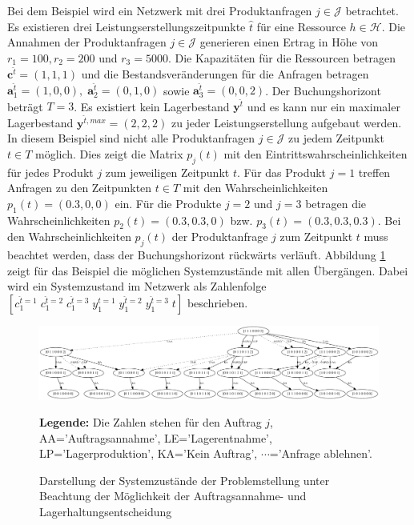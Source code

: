 Bei dem Beispiel wird ein Netzwerk mit drei Produktanfragen $j\in\mathcal{J}$ betrachtet. Es existieren drei Leistungserstellungszeitpunkte $\hat t$ für eine Ressource $h\in\mathcal{H}$. Die Annahmen der Produktanfragen $j\in\mathcal{J}$ generieren einen Ertrag in Höhe von $r_1=100, r_2=200$ und $r_3=5000$. Die Kapazitäten für die Ressourcen betragen $\textbf{c}^{\hat t}=(1,1,1)$ und die Bestandsveränderungen für die Anfragen betragen $\textbf{a}^{\hat t}_1=(1,0,0),\; \textbf{a}^{\hat t}_2=(0,1,0)$ sowie $\textbf{a}^{\hat t}_3=(0,0,2)$. Der Buchungshorizont beträgt $T=3$. Es existiert kein Lagerbestand $\textbf{y}^{\hat t}$ und es kann nur ein maximaler Lagerbestand $\textbf{y}^{\hat t, max}=(2, 2, 2)$ zu jeder Leistungserstellung aufgebaut werden. In diesem Beispiel sind nicht alle Produktanfragen $j\in\mathcal{J}$ zu jedem Zeitpunkt $t\in T$ möglich. Dies zeigt die Matrix $p_{j}(t)$ mit den Eintrittswahrscheinlichkeiten für jedes Produkt $j$ zum jeweiligen Zeitpunkt $t$. Für das Produkt $j=1$ treffen Anfragen zu den Zeitpunkten $t\in T$ mit den Wahrscheinlichkeiten $p_{1}(t)=(0.3, 0, 0)$ ein. Für die Produkte $j=2$ und $j=3$ betragen die Wahrscheinlichkeiten $p_{2}(t)=(0.3, 0.3, 0)$ bzw. $p_{3}(t)=(0.3, 0.3, 0.3)$. Bei den Wahrscheinlichkeiten $p_j(t)$ der Produktanfrage $j$ zum Zeitpunkt $t$ muss beachtet werden, dass der Buchungshorizont rückwärts verläuft. Abbildung \ref{B9} zeigt für das Beispiel die möglichen Systemzustände mit allen Übergängen. Dabei wird ein Systemzustand im Netzwerk als Zahlenfolge $[c^{\hat t=1}_1\;c^{\hat t=2}_1\;c_1^{\hat t=3}\;y_1^{\hat t=1}\;y_1^{\hat t=2}\;y_1^{\hat t=3}\;t]$ beschrieben.

\begin{figure}[h!]
  \begin{center}
    \includegraphics[width=200mm, angle=90]{Bilder/Beispiel9.pdf}
    \caption{Darstellung der Systemzustände der Problemstellung unter Beachtung der Möglichkeit der Auftragsannahme- und Lagerhaltungsentscheidung}  \label{B9}
    {\footnotesize \textbf{Legende:} Die Zahlen stehen für den Auftrag $j$, AA='Auftragsannahme', LE='Lagerentnahme', LP='Lagerproduktion', KA='Kein Auftrag', $\cdots$='Anfrage ablehnen'.} 
  \end{center}
\end{figure}

